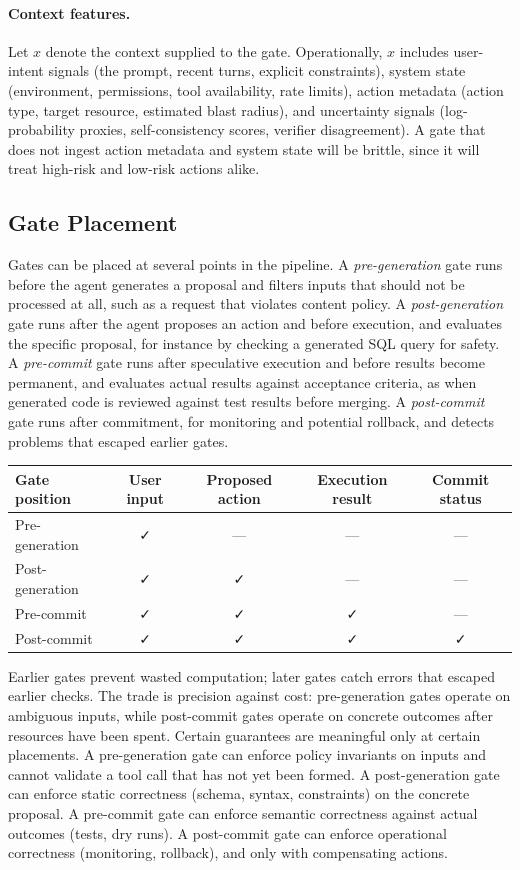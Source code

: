 \documentclass[11pt]{book}
\begin{document}
\paragraph{Context features.}
Let $x$ denote the context supplied to the gate. Operationally, $x$ includes user-intent signals (the prompt, recent turns, explicit constraints), system state (environment, permissions, tool availability, rate limits), action metadata (action type, target resource, estimated blast radius), and uncertainty signals (log-probability proxies, self-consistency scores, verifier disagreement). A gate that does not ingest action metadata and system state will be brittle, since it will treat high-risk and low-risk actions alike.

\subsection{Gate Placement}

Gates can be placed at several points in the pipeline. A \textit{pre-generation} gate runs before the agent generates a proposal and filters inputs that should not be processed at all, such as a request that violates content policy. A \textit{post-generation} gate runs after the agent proposes an action and before execution, and evaluates the specific proposal, for instance by checking a generated SQL query for safety. A \textit{pre-commit} gate runs after speculative execution and before results become permanent, and evaluates actual results against acceptance criteria, as when generated code is reviewed against test results before merging. A \textit{post-commit} gate runs after commitment, for monitoring and potential rollback, and detects problems that escaped earlier gates.

\begin{center}
\begin{tabular}{lcccc}
\toprule
Gate position & User input & Proposed action & Execution result & Commit status \\
\midrule
Pre-generation & ✓ & --- & --- & --- \\
Post-generation & ✓ & ✓ & --- & --- \\
Pre-commit & ✓ & ✓ & ✓ & --- \\
Post-commit & ✓ & ✓ & ✓ & ✓ \\
\bottomrule
\end{tabular}
\end{center}

Earlier gates prevent wasted computation; later gates catch errors that escaped earlier checks. The trade is precision against cost: pre-generation gates operate on ambiguous inputs, while post-commit gates operate on concrete outcomes after resources have been spent. Certain guarantees are meaningful only at certain placements. A pre-generation gate can enforce policy invariants on inputs and cannot validate a tool call that has not yet been formed. A post-generation gate can enforce static correctness (schema, syntax, constraints) on the concrete proposal. A pre-commit gate can enforce semantic correctness against actual outcomes (tests, dry runs). A post-commit gate can enforce operational correctness (monitoring, rollback), and only with compensating actions.
\end{document}
